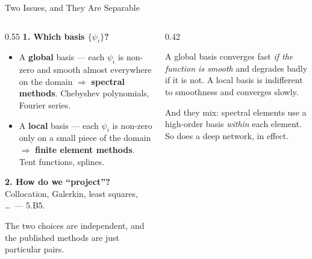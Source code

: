 \begin{frame}{Two Issues, and They Are Separable}
\begin{columns}[T]
\begin{column}{0.55\textwidth}
\small
\textbf{1. Which basis $\{\psi_i\}$?}
\medskip
\begin{itemize}\small
  \item A \textbf{global} basis --- each $\psi_i$ is non-zero and smooth almost everywhere on the domain $\Rightarrow$ \textbf{spectral methods}. Chebyshev polynomials, Fourier series.
  \item A \textbf{local} basis --- each $\psi_i$ is non-zero only on a small piece of the domain $\Rightarrow$ \textbf{finite element methods}. Tent functions, splines.
\end{itemize}
\medskip
\textbf{2. How do we ``project''?} Collocation, Galerkin, least squares, \dots\ --- 5.B5.
\medskip

The two choices are independent, and the published methods are just particular pairs.
\end{column}
\begin{column}{0.42\textwidth}
\begin{conceptbox}[title=\textbf{The trade}]\small
A global basis converges fast \emph{if the function is smooth} and degrades badly if it is not. A local basis is indifferent to smoothness and converges slowly.
\end{conceptbox}
\medskip
\begin{examplebox}\footnotesize
And they mix: spectral elements use a high-order basis \emph{within} each element. So does a deep network, in effect.
\end{examplebox}
\end{column}
\end{columns}
\vspace{1mm}
\end{frame}

